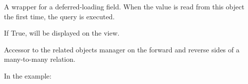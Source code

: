 \documentclass[letterpaper,10pt,english]{sphinxmanual}
\begin{document}
\begin{fulllineitems}
\begin{fulllineitems}
\label{\detokenize{modules/models:gestion.models.Product.history}}
\end{fulllineitems}


\begin{fulllineitems}
\label{\detokenize{modules/models:gestion.models.Product.id}}
A wrapper for a deferred-loading field. When the value is read from this
object the first time, the query is executed.

\end{fulllineitems}


\begin{fulllineitems}
\label{\detokenize{modules/models:gestion.models.Product.is_active}}
If True, will be displayed on the {\hyperref[\detokenize{modules/views:gestion.views.manage}]{}} view.

\end{fulllineitems}


\begin{fulllineitems}
\label{\detokenize{modules/models:gestion.models.Product.menu_set}}
Accessor to the related objects manager on the forward and reverse sides of
a many-to-many relation.

In the example:

\begin{sphinxVerbatim}[commandchars=\\\{\}]
 
       
\end{sphinxVerbatim}


\end{fulllineitems}
\end{fulllineitems}
\end{document}
